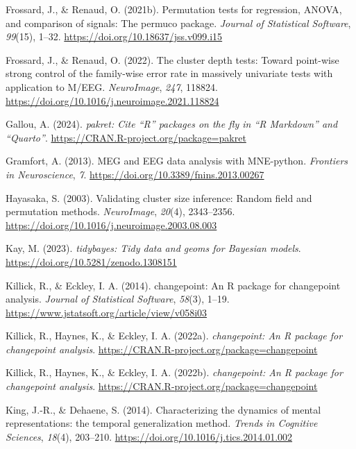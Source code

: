 \documentclass[
  doc,
  floatsintext,
  longtable,
  a4paper,
  nolmodern,
  notxfonts,
  notimes,
  colorlinks=true,linkcolor=blue,citecolor=blue,urlcolor=blue]{apa7}
\newlength{\cslhangindent}
\newenvironment{CSLReferences}[2] %
 {\begin{list}{}{%
  \setlength{\itemindent}{0pt}
  \setlength{\leftmargin}{0pt}
  \setlength{\parsep}{0pt}
  \ifodd #1
   \setlength{\leftmargin}{\cslhangindent}
   \setlength{\itemindent}{-1\cslhangindent}
  \fi
  \setlength{\itemsep}{#2\baselineskip}}}
 {\end{list}}
\begin{document}
\begin{CSLReferences}{1}{0}
Frossard, J., \& Renaud, O. (2021b). Permutation tests for regression,
{ANOVA}, and comparison of signals: The {permuco} package. \emph{Journal
of Statistical Software}, \emph{99}(15), 1--32.
\url{https://doi.org/10.18637/jss.v099.i15}

Frossard, J., \& Renaud, O. (2022). The cluster depth tests: Toward
point-wise strong control of the family-wise error rate in massively
univariate tests with application to M/EEG. \emph{NeuroImage},
\emph{247}, 118824.
\url{https://doi.org/10.1016/j.neuroimage.2021.118824}

Gallou, A. (2024). \emph{{pakret}: Cite {``{R}''} packages on the fly in
{``{R Markdown}''} and {``{Quarto}''}}.
\url{https://CRAN.R-project.org/package=pakret}

Gramfort, A. (2013). MEG and EEG data analysis with MNE-python.
\emph{Frontiers in Neuroscience}, \emph{7}.
\url{https://doi.org/10.3389/fnins.2013.00267}

Hayasaka, S. (2003). Validating cluster size inference: Random field and
permutation methods. \emph{NeuroImage}, \emph{20}(4), 2343--2356.
\url{https://doi.org/10.1016/j.neuroimage.2003.08.003}

Kay, M. (2023). \emph{{tidybayes}: Tidy data and geoms for {Bayesian}
models}. \url{https://doi.org/10.5281/zenodo.1308151}

Killick, R., \& Eckley, I. A. (2014). {changepoint}: An {R} package for
changepoint analysis. \emph{Journal of Statistical Software},
\emph{58}(3), 1--19.
\url{https://www.jstatsoft.org/article/view/v058i03}

Killick, R., Haynes, K., \& Eckley, I. A. (2022a). \emph{{changepoint}:
An {R} package for changepoint analysis}.
\url{https://CRAN.R-project.org/package=changepoint}

Killick, R., Haynes, K., \& Eckley, I. A. (2022b). \emph{{changepoint}:
An {R} package for changepoint analysis}.
\url{https://CRAN.R-project.org/package=changepoint}

King, J.-R., \& Dehaene, S. (2014). Characterizing the dynamics of
mental representations: the temporal generalization method. \emph{Trends
in Cognitive Sciences}, \emph{18}(4), 203--210.
\url{https://doi.org/10.1016/j.tics.2014.01.002}


\end{CSLReferences}
\end{document}

